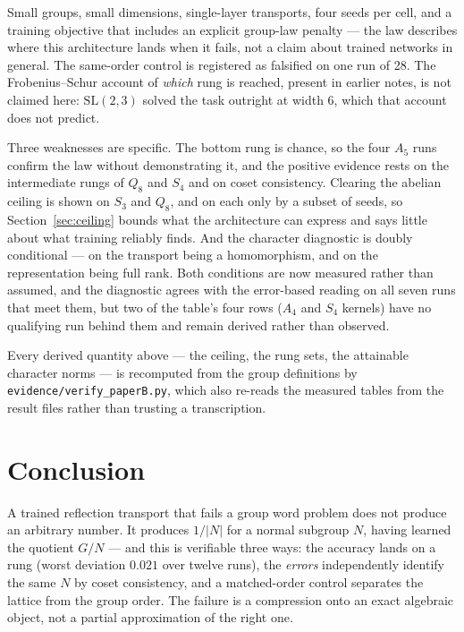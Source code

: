 \documentclass[10pt]{article}
\begin{document}
Small groups, small dimensions, single-layer transports, four seeds per cell, and a training
objective that includes an explicit group-law penalty --- the law describes where this architecture
lands when it fails, not a claim about trained networks in general. The same-order control is
registered as falsified on one run of 28. The Frobenius--Schur account of \emph{which} rung is
reached, present in earlier notes, is not claimed here: $\mathrm{SL}(2,3)$ solved the task outright at
width 6, which that account does not predict.

Three weaknesses are specific. The bottom rung is chance, so the four $A_5$ runs confirm the law
without demonstrating it, and the positive evidence rests on the intermediate rungs of $Q_8$ and
$S_4$ and on coset consistency. Clearing the abelian ceiling is shown on $S_3$ and $Q_8$, and on each
only by a subset of seeds, so Section~\ref{sec:ceiling} bounds what the architecture can express and
says little about what training reliably finds. And the character diagnostic is doubly conditional
--- on the transport being a homomorphism, and on the representation being full rank. Both conditions
are now measured rather than assumed, and the diagnostic agrees with the error-based reading on all
seven runs that meet them, but two of the table's four rows ($A_4$ and $S_4$ kernels) have no
qualifying run behind them and remain derived rather than observed.

Every derived quantity above --- the ceiling, the rung sets, the attainable character norms --- is
recomputed from the group definitions by \texttt{evidence/verify\_paperB.py}, which also re-reads the
measured tables from the result files rather than trusting a transcription.

\section{Conclusion}

A trained reflection transport that fails a group word problem does not produce an arbitrary number.
It produces $1/|N|$ for a normal subgroup $N$, having learned the quotient $G/N$ --- and this is
verifiable three ways: the accuracy lands on a rung (worst deviation $0.021$ over twelve runs), the
\emph{errors} independently identify the same $N$ by coset consistency, and a matched-order control
separates the lattice from the group order. The failure is a compression onto an exact algebraic
object, not a partial approximation of the right one.
\end{document}
